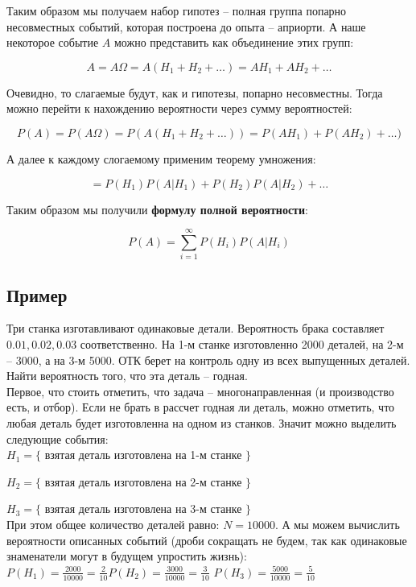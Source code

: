 \documentclass{article}
\begin{document}
Таким образом мы получаем набор гипотез -- полная группа попарно несовместных событий, которая построена до опыта -- априорти. А наше некоторое событие $A$ можно представить как объединение этих групп:

$$ A = A  \Omega = A (H_1 + H_2 + \ldots) = AH_1 + AH_2 + \ldots$$

Очевидно, то слагаемые будут, как и гипотезы, попарно несовместны. Тогда можно перейти к нахождению вероятности через сумму вероятностей:

$$ P(A) = P(A\Omega) = P(A(H_1 + H_2 + \ldots)) = P(AH_1) + P(AH_2) + \ldots) $$

А далее к каждому слогаемому применим теорему умножения:

$$ = P(H_1)P(A|H_1) + P(H_2)P(A|H_2) + \ldots $$

Таким образом мы получили \textbf{формулу полной вероятности}:

$$ P(A) = \sum\limits_{i = 1}^\infty P(H_i)P(A|H_i) $$

\subsection{Пример}

Три станка изготавливают одинаковые детали. Вероятность брака составляет $0.01, 0.02, 0.03$ соответственно. На 1-м станке изготовленно 2000 деталей, на 2-м -- 3000, а на 3-м 5000. ОТК берет на контроль одну из всех выпущенных деталей. Найти вероятность того, что эта деталь -- годная.
\\

Первое, что стоить отметить, что задача -- многонаправленная (и производство есть, и отбор). Если не брать в рассчет годная ли деталь, можно отметить, что любая деталь будет изготовленна на одном из станков. Значит можно выделить следующие события:
\\

$H_1 = \{$ взятая деталь изготовлена на 1-м станке $\}$

$H_2 = \{$ взятая деталь изготовлена на 2-м станке $\}$

$H_3 = \{$ взятая деталь изготовлена на 3-м станке $\}$
\\

При этом общее количество деталей равно: $N = 10000$. А мы можем вычислить вероятности описанных событий (дроби сокращать не будем, так как одинаковые знаменатели могут в будущем упростить жизнь):
\\

$P(H_1) = \frac{2000}{10000} = \frac{2}{10}$\qquad$P(H_2) = \frac{3000}{10000} = \frac{3}{10}$
\qquad$P(H_3) = \frac{5000}{10000} = \frac{5}{10}$
\\
\end{document}

